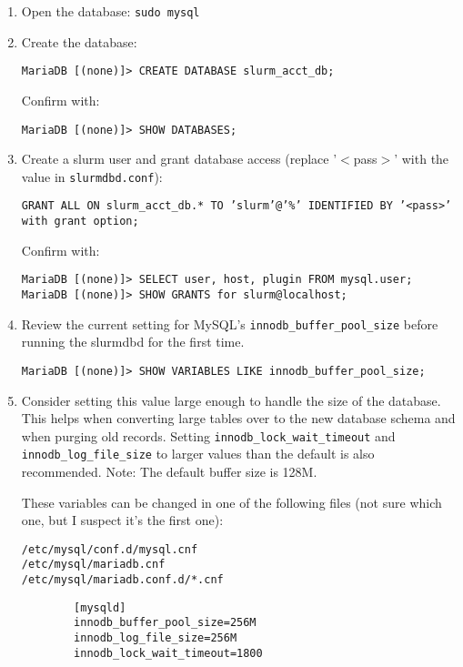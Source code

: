 \begin{enumerate}
	\begin{enumerate}
	\item Open the database: \texttt{sudo mysql} %

	\item Create the database:

		\texttt{MariaDB [(none)]> CREATE DATABASE slurm\_acct\_db;}
	
		Confirm with:

		\texttt{MariaDB [(none)]> SHOW DATABASES;}
	
	\item Create a slurm user and grant database access (replace '$<$pass$>$' with the value in \texttt{slurmdbd.conf}):

		\texttt{GRANT ALL ON slurm\_acct\_db.* TO 'slurm'@'\%' IDENTIFIED BY '<pass>' with grant option;}
	
		Confirm with:

		\texttt{MariaDB [(none)]> SELECT user, host, plugin FROM mysql.user;} \\
		\texttt{MariaDB [(none)]> SHOW GRANTS for slurm@localhost;}

	\item Review the current setting for MySQL's \texttt{innodb\_buffer\_pool\_size} before running the slurmdbd for the first time.

		\texttt{MariaDB [(none)]> SHOW VARIABLES LIKE innodb\_buffer\_pool\_size;}

	\item Consider setting this value large enough to handle the size of the database. This helps when converting large tables over to the new database schema and when purging old records. Setting \texttt{innodb\_lock\_wait\_timeout} and \texttt{innodb\_log\_file\_size} to larger values than the default is also recommended. Note: The default buffer size is 128M.

		These variables can be changed in one of the following files (not sure which one, but I suspect it's the first one):

		\texttt{/etc/mysql/conf.d/mysql.cnf} \\
		\texttt{/etc/mysql/mariadb.cnf} \\
		\texttt{/etc/mysql/mariadb.conf.d/*.cnf}

		\begin{verbatim}
		[mysqld]
		innodb_buffer_pool_size=256M
		innodb_log_file_size=256M
		innodb_lock_wait_timeout=1800
		\end{verbatim}


\end{enumerate}
\end{enumerate}
